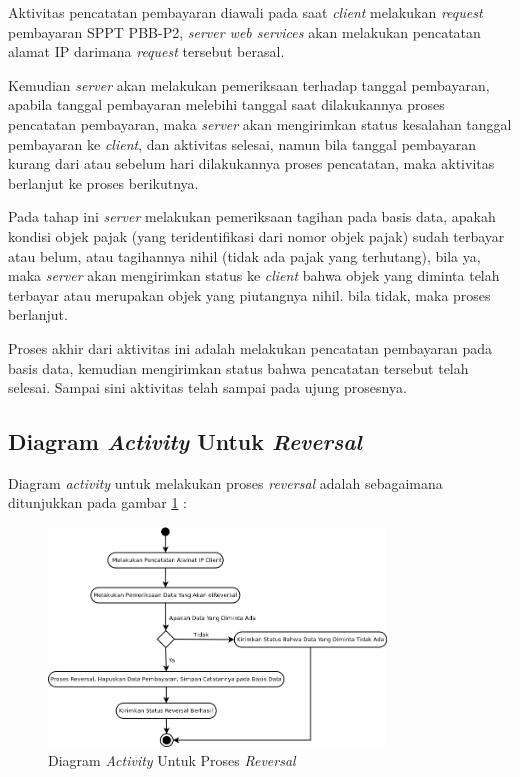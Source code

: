 Aktivitas pencatatan pembayaran diawali pada saat \textit{client} melakukan \textit{request} pembayaran SPPT PBB-P2, \textit{server web services} akan melakukan pencatatan alamat IP darimana \textit{request} tersebut berasal.

Kemudian \textit{server} akan melakukan pemeriksaan terhadap tanggal pembayaran, apabila tanggal pembayaran melebihi tanggal saat dilakukannya proses pencatatan pembayaran, maka \textit{server} akan mengirimkan status kesalahan tanggal pembayaran ke \textit{client}, dan aktivitas selesai, namun bila tanggal pembayaran kurang dari atau sebelum hari dilakukannya proses pencatatan, maka aktivitas berlanjut ke proses berikutnya.

Pada tahap ini \textit{server} melakukan pemeriksaan tagihan pada basis data, apakah kondisi objek pajak (yang teridentifikasi dari nomor objek pajak) sudah terbayar atau belum, atau tagihannya nihil (tidak ada pajak yang terhutang), bila ya, maka \textit{server} akan mengirimkan status ke \textit{client} bahwa objek yang diminta telah terbayar atau merupakan objek yang piutangnya nihil. bila tidak, maka proses berlanjut.

Proses akhir dari aktivitas ini adalah melakukan pencatatan pembayaran pada basis data, kemudian mengirimkan status bahwa pencatatan tersebut telah selesai. Sampai sini aktivitas telah sampai pada ujung prosesnya.

\subsection{Diagram \textit{Activity} Untuk \textit{Reversal}}

Diagram \textit{activity} untuk melakukan proses \textit{reversal} adalah sebagaimana ditunjukkan pada gambar \ref{fig:act-reversal} :

\begin{figure}[H]
  \centering
  \includegraphics[width=0.8\textwidth]{./resources/uml/uml-act-reversal}
  \caption{Diagram \textit{Activity} Untuk Proses \textit{Reversal}}
  \label{fig:act-reversal}
\end{figure}

